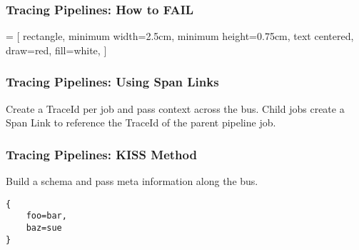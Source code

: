 \begin{frame}
    \frametitle{Tracing Pipelines: How to FAIL}
    \centering
\end{frame}

 = [
    rectangle,
    minimum width=2.5cm, 
    minimum height=0.75cm,
    text centered, 
    draw=red, 
    fill=white,
]
\begin{frame}
    \frametitle{Tracing Pipelines: Using Span Links}
    \centering
    \raggedright

    Create a TraceId per job and pass context across the bus.  Child jobs
    create a Span Link to reference the TraceId of the parent pipeline job.
\end{frame}

\begin{frame}[fragile]
    \frametitle{Tracing Pipelines: KISS Method}

    Build a schema and pass meta information along the bus.
    \begin{lstlisting}
{
    foo=bar,
    baz=sue
}
    \end{lstlisting}
\end{frame}
